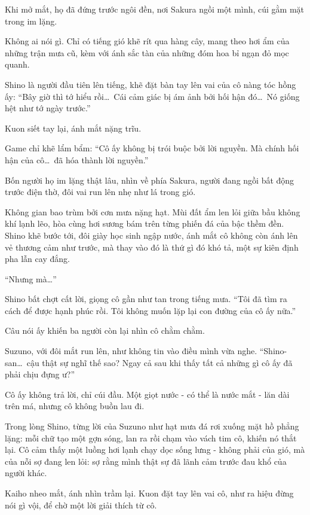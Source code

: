 \documentclass[../main.tex]{subfiles}
\begin{document}
Khi mở mắt, họ đã đứng trước ngôi đền, nơi Sakura ngồi một mình, cúi gằm mặt trong im lặng.

Không ai nói gì. Chỉ có tiếng gió khẽ rít qua hàng cây, mang theo hơi ẩm của những trận mưa cũ, kèm với ánh sắc tàn của những đóm hoa bỉ ngạn đỏ mọc quanh.

Shino là người đầu tiên lên tiếng, khẽ đặt bàn tay lên vai của cô nàng tóc hồng ấy: ``Bây giờ thì tớ hiểu rồi\dots\ Cái cảm giác bị ám ảnh bởi hối hận đó\dots\ Nó giống hệt như tớ ngày trước.''


Kuon siết tay lại, ánh mắt nặng trĩu.

Game chỉ khẽ lẩm bẩm: ``Cô ấy không bị trói buộc bởi lời nguyền. Mà chính hối hận của cô\dots\ đã hóa thành lời nguyền.''

Bốn người họ im lặng thật lâu, nhìn về phía Sakura, người đang ngồi bất động trước điện thờ, đôi vai run lên nhẹ như lá trong gió.

Không gian bao trùm bởi cơn mưa nặng hạt. Mùi đất ẩm len lỏi giữa bầu không khí lạnh lẽo, hòa cùng hơi sương bám trên từng phiến đá của bậc thềm đền. Shino khẽ bước tới, đôi giày học sinh ngập nước, ánh mắt cô không còn ánh lên vẻ thương cảm như trước, mà thay vào đó là thứ gì đó khó tả, một sự kiên định pha lẫn cay đắng.

``Nhưng mà\dots''

Shino bất chợt cất lời, giọng cô gần như tan trong tiếng mưa. ``Tôi đã tìm ra cách để được hạnh phúc rồi. Tôi không muốn lặp lại con đường của cô ấy nữa.''

Câu nói ấy khiến ba người còn lại nhìn cô chằm chằm.

Suzuno, với đôi mắt run lên, như không tin vào điều mình vừa nghe. ``Shino-san\dots\ cậu thật sự nghĩ thế sao? Ngay cả sau khi thấy tất cả những gì cô ấy đã phải chịu đựng ư?''

Cô ấy không trả lời, chỉ cúi đầu. Một giọt nước - có thể là nước mắt - lăn dài trên má, nhưng cô không buồn lau đi.

Trong lòng Shino, từng lời của Suzuno như hạt mưa đá rơi xuống mặt hồ phẳng lặng: mỗi chữ tạo một gợn sóng, lan ra rồi chạm vào vách tim cô, khiến nó thắt lại. Cô cảm thấy một luồng hơi lạnh chạy dọc sống lưng - không phải của gió, mà của nỗi sợ đang len lỏi: sợ rằng mình thật sự đã lãnh cảm trước đau khổ của người khác.

Kaiho nheo mắt, ánh nhìn trầm lại. Kuon đặt tay lên vai cô, như ra hiệu đừng nói gì vội, để chờ một lời giải thích từ cô.
\end{document}
